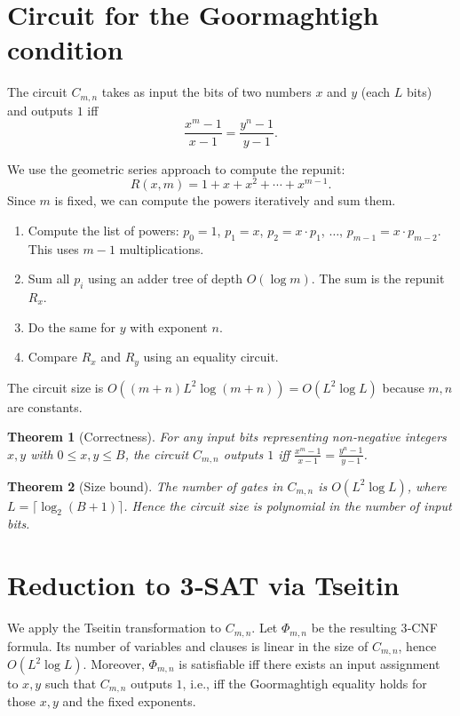 \documentclass[11pt,a4paper]{article}
\newtheorem{theorem}{Theorem}[section]
\begin{document}
\section{Circuit for the Goormaghtigh condition}

The circuit \(C_{m,n}\) takes as input the bits of two numbers \(x\) and \(y\) (each \(L\) bits) and outputs \(1\) iff
\[
\frac{x^{m}-1}{x-1} = \frac{y^{n}-1}{y-1}.
\]

We use the geometric series approach to compute the repunit:
\[
R(x,m) = 1 + x + x^2 + \cdots + x^{m-1}.
\]
Since \(m\) is fixed, we can compute the powers iteratively and sum them.

\begin{enumerate}
\item Compute the list of powers: \(p_0 = 1\), \(p_1 = x\), \(p_2 = x \cdot p_1\), \(\dots\), \(p_{m-1} = x \cdot p_{m-2}\). This uses \(m-1\) multiplications.
\item Sum all \(p_i\) using an adder tree of depth \(O(\log m)\). The sum is the repunit \(R_x\).
\item Do the same for \(y\) with exponent \(n\).
\item Compare \(R_x\) and \(R_y\) using an equality circuit.
\end{enumerate}

The circuit size is \(O((m+n) L^2 \log (m+n)) = O(L^2 \log L)\) because \(m,n\) are constants.

\begin{theorem}[Correctness]
For any input bits representing non‑negative integers \(x,y\) with \(0\le x,y \le B\), the circuit \(C_{m,n}\) outputs \(1\) iff \(\frac{x^{m}-1}{x-1} = \frac{y^{n}-1}{y-1}\).
\end{theorem}

\begin{theorem}[Size bound]
The number of gates in \(C_{m,n}\) is \(O(L^2 \log L)\), where \(L = \lceil \log_2(B+1)\rceil\). Hence the circuit size is polynomial in the number of input bits.
\end{theorem}

\section{Reduction to 3‑SAT via Tseitin}

We apply the Tseitin transformation to \(C_{m,n}\). Let \(\Phi_{m,n}\) be the resulting 3‑CNF formula. Its number of variables and clauses is linear in the size of \(C_{m,n}\), hence \(O(L^2 \log L)\). Moreover, \(\Phi_{m,n}\) is satisfiable iff there exists an input assignment to \(x,y\) such that \(C_{m,n}\) outputs \(1\), i.e., iff the Goormaghtigh equality holds for those \(x,y\) and the fixed exponents.
\end{document}
